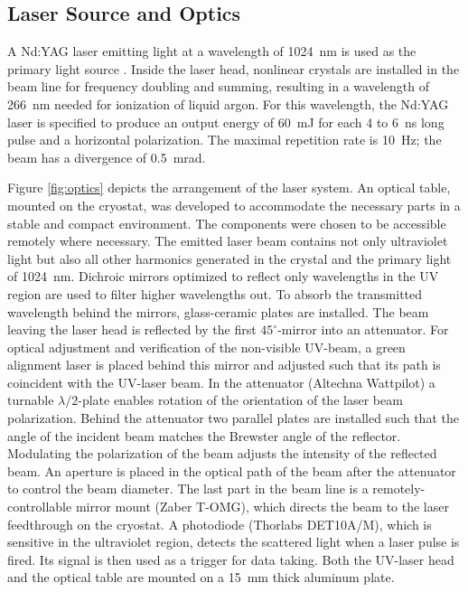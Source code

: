 \subsection{Laser Source and Optics}
A Nd:YAG laser emitting light at a wavelength of 1024~nm is used as the primary light source \cite{continuum}. Inside the laser head, nonlinear crystals are installed in the beam line for frequency doubling and summing, resulting in a wavelength of 266~nm needed for ionization of liquid argon. For this wavelength, the Nd:YAG laser is specified to produce an output energy of 60~mJ for each 4 to 6~ns long pulse and a horizontal polarization. The maximal repetition rate is 10~Hz; the beam has a divergence of 0.5~mrad.

Figure \ref{fig:optics} depicts the arrangement of the laser system.  An optical table, mounted on the cryostat, was developed to accommodate the necessary parts in a stable and compact environment. The components were chosen to be accessible remotely where necessary. The emitted laser beam contains not only ultraviolet light but also all other harmonics generated in the crystal and the primary light of 1024~nm. Dichroic mirrors optimized to reflect only wavelengths in the UV region are used to filter higher wavelengths out. To absorb the transmitted wavelength behind the mirrors, glass-ceramic plates are installed. The beam leaving the laser head is reflected by the first $45^{\circ}$-mirror into an attenuator. For optical adjustment and verification of the non-visible UV-beam, a green alignment laser is placed behind this mirror and adjusted such that its path is coincident with the UV-laser beam. In the attenuator (Altechna Wattpilot) a turnable $\lambda/2$-plate enables rotation of the orientation of the laser beam polarization. Behind the attenuator two parallel plates are installed such that the angle of the incident beam matches the Brewster angle of the reflector. Modulating the polarization of the beam adjusts the intensity of the reflected beam. An aperture is placed in the optical path of the beam after the attenuator to control the beam diameter. The last part in the beam line is a remotely-controllable mirror mount (Zaber T-OMG), which directs the beam to the laser feedthrough on the cryostat. A photodiode (Thorlabs DET10A/M), which is sensitive in the ultraviolet region, detects the scattered light when a laser pulse is fired.  Its signal is then used as a trigger for data taking. Both the UV-laser head and the optical table are mounted on a 15~mm thick aluminum plate.

